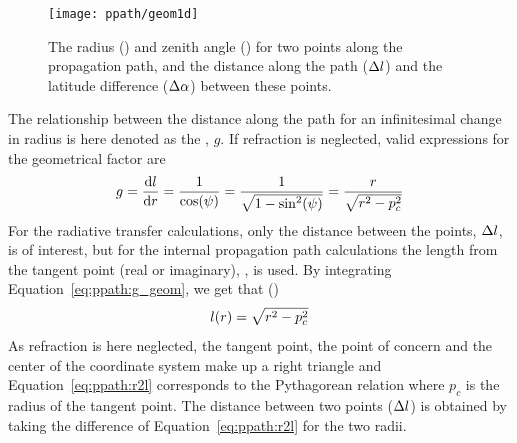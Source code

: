 \begin{figure}[!t]
 \begin{center}
  \begin{minipage}[c]{0.65\textwidth}
   \begin{center}
    \texttt{[image: ppath/geom1d]}
   \end{center}
  \end{minipage}%
  \begin{minipage}[c]{0.35\textwidth}
   \caption{The radius (\Rds) and zenith angle (\ZntAng) for two points along
     the propagation path, and the distance along the path ($\Delta l$)
     and the latitude difference ($\Delta\alpha$) between these points.}
   \label{fig:ppath:1d2dgeom}
  \end{minipage}
 \end{center}
\end{figure}   

The relationship between the distance along the path for an
infinitesimal change in radius is here denoted as the
, $g$. If refraction is neglected, valid
expressions for the geometrical factor are
\begin{equation}
  g = \frac{\mathrm{d} l}{\mathrm{d} r} 
           = \frac{1}{\cos(\psi)} = \frac{1}{\sqrt{1-\sin^2(\psi)}}
                                            = \frac{r}{\sqrt{r^2-p_c^2}}
  \label{eq:ppath:g_geom}
\end{equation}
For the radiative transfer calculations, only the distance between the
points, $\Delta l$, is of interest, but for the internal
propagation path calculations the length from the tangent point (real
or imaginary), \PpathLng, is used. By integrating
Equation~\ref{eq:ppath:g_geom}, we get that
()
\begin{equation}
  l(r) = \sqrt{r^2-p_c^2} 
  \label{eq:ppath:r2l}
\end{equation}
As refraction is here neglected, the tangent point, the point of
concern and the center of the coordinate system make up a right
triangle and Equation~\ref{eq:ppath:r2l} corresponds to the
Pythagorean relation where $p_c$ is the radius of the tangent point.
The distance between two points ($\Delta l$) is obtained by
taking the difference of Equation~\ref{eq:ppath:r2l} for the two
radii.

